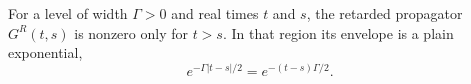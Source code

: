 \documentclass{article}
\begin{document}
For a level of width $\Gamma>0$ and real times $t$ and $s$, the retarded propagator $G^R(t,s)$ is
nonzero only for $t>s$. In that region its envelope is a plain exponential,
\begin{equation}
e^{-\Gamma|t-s|/2} = e^{-(t-s)\Gamma/2} .
\label{eq:env}
\end{equation}
\end{document}
